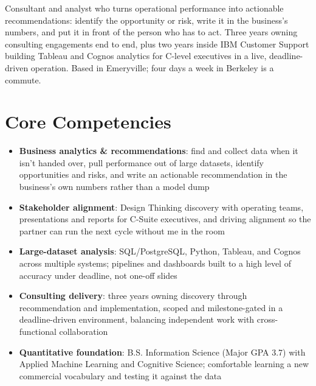 \documentclass[11pt,a4paper,sans]{moderncv}
\begin{document}
\makecvtitle


\vspace{6pt}
\small{Consultant and analyst who turns operational performance into actionable recommendations: identify the opportunity or risk, write it in the business's numbers, and put it in front of the person who has to act. Three years owning consulting engagements end to end, plus two years inside IBM Customer Support building Tableau and Cognos analytics for C-level executives in a live, deadline-driven operation. Based in Emeryville; four days a week in Berkeley is a commute.}


\section{Core Competencies}
\vspace{1pt}
\begin{itemize}

\item \textbf{Business analytics \& recommendations}: find and collect data when it isn't handed over, pull performance out of large datasets, identify opportunities and risks, and write an actionable recommendation in the business's own numbers rather than a model dump

\item \textbf{Stakeholder alignment}: Design Thinking discovery with operating teams, presentations and reports for C-Suite executives, and driving alignment so the partner can run the next cycle without me in the room

\item \textbf{Large-dataset analysis}: SQL/PostgreSQL, Python, Tableau, and Cognos across multiple systems; pipelines and dashboards built to a high level of accuracy under deadline, not one-off slides

\item \textbf{Consulting delivery}: three years owning discovery through recommendation and implementation, scoped and milestone-gated in a deadline-driven environment, balancing independent work with cross-functional collaboration

\item \textbf{Quantitative foundation}: B.S. Information Science (Major GPA 3.7) with Applied Machine Learning and Cognitive Science; comfortable learning a new commercial vocabulary and testing it against the data

\end{itemize}
\end{document}
